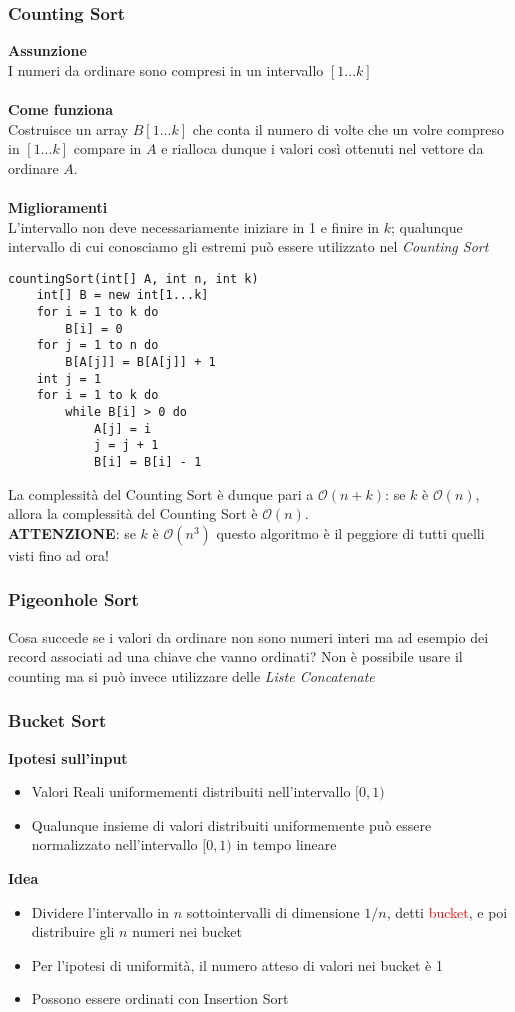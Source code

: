 \documentclass[../cheatSheetAlgoritmi.tex]{subfiles}
\begin{document}
\subsubsection{Counting Sort}
\textbf{Assunzione}\\
I numeri da ordinare sono compresi in un intervallo $[1...k]$\\\\
\textbf{Come funziona}\\
Costruisce un array $B[1...k]$ che conta il numero di volte che un volre compreso in $[1...k]$ compare in $A$ e rialloca dunque i valori così ottenuti nel vettore da ordinare $A$.\\\\
\textbf{Miglioramenti}\\
L'intervallo non deve necessariamente iniziare in 1 e finire in $k$; qualunque intervallo di cui conosciamo gli estremi può essere utilizzato nel \emph{Counting Sort}
\begin{lstlisting}[caption=Counting Sort]
countingSort(int[] A, int n, int k)
	int[] B = new int[1...k]
	for i = 1 to k do
		B[i] = 0
	for j = 1 to n do
		B[A[j]] = B[A[j]] + 1
	int j = 1
	for i = 1 to k do
		while B[i] > 0 do
			A[j] = i
			j = j + 1
			B[i] = B[i] - 1
\end{lstlisting}
La complessità del Counting Sort è dunque pari a $\mathcal{O}(n + k)$: se $k$ è $\mathcal{O}(n)$, allora la complessità del Counting Sort è $\mathcal{O}(n)$.\\
\textbf{ATTENZIONE}: se $k$ è $\mathcal{O}(n^{3})$ questo algoritmo è il peggiore di tutti quelli visti fino ad ora!
\subsubsection{Pigeonhole Sort}
Cosa succede se i valori da ordinare non sono numeri interi ma ad esempio dei record associati ad una chiave che vanno ordinati? Non è possibile usare il counting ma si può invece utilizzare delle \emph{Liste Concatenate}
\subsubsection{Bucket Sort}
\textbf{Ipotesi sull'input}
\begin{itemize}
	\item Valori Reali uniformementi distribuiti nell'intervallo $[0, 1)$
	\item Qualunque insieme di valori distribuiti uniformemente può essere normalizzato nell'intervallo $[0, 1)$ in tempo lineare
\end{itemize}
\textbf{Idea}
\begin{itemize}
	\item Dividere l'intervallo in $n$ sottointervalli di dimensione $1/n$, detti \textcolor{red}{bucket}, e poi distribuire gli $n$ numeri nei bucket
	\item Per l'ipotesi di uniformità, il numero atteso di valori nei bucket è 1
	\item Possono essere ordinati con Insertion Sort
\end{itemize}
\end{document}
